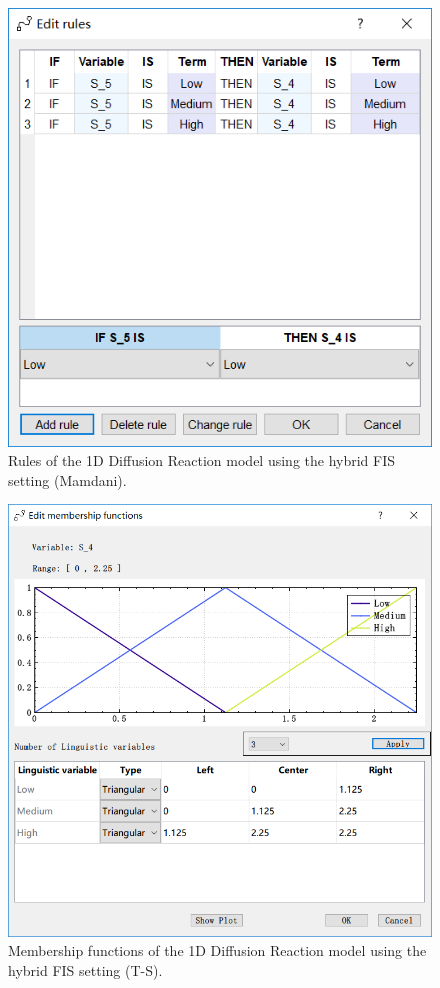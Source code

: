\documentclass[journal,a4paper,onecolumn]{article}
\begin{document}
\begin{figure}[!hbt]
	\begin{center}
		\includegraphics[width=\columnwidth]{fig38}
		\caption{Rules of the 1D Diffusion Reaction model using the hybrid FIS setting (Mamdani).}
		\label{fig:Rules of 1D Diffusion Reaction using hybrid FIS (Mamdani).}
	\end{center}
\end{figure}

\begin{figure}[!hbt]
	\begin{center}
		\includegraphics[width=0.9\columnwidth]{fig39}
		\caption{Membership functions of the 1D Diffusion Reaction model using the hybrid FIS setting (T-S).}
		\label{fig:Membership functions of 1D Diffusion Reaction using hybrid FIS (T-S).}
	\end{center}
\end{figure}
\end{document}
